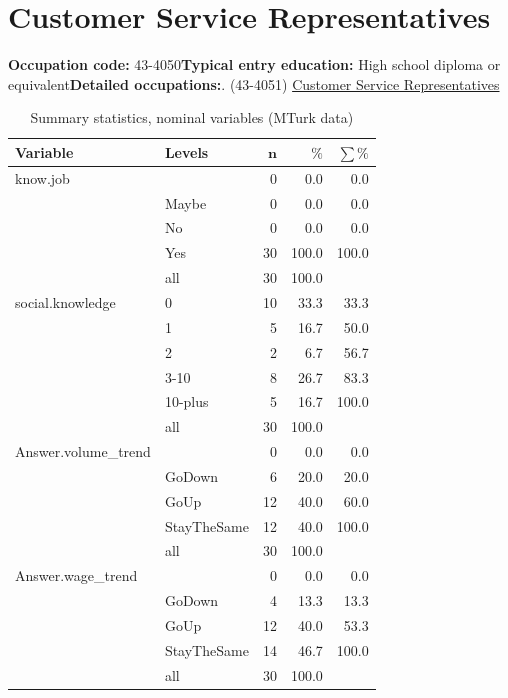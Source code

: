 \documentclass[a4paper,10pt]{article}\usepackage[]{graphicx}\usepackage[]{color}
\begin{document}
\newpage\section{Customer Service Representatives}\textbf{Occupation code:} 43-4050\newline\textbf{Typical entry education:} High school diploma or equivalent\newline\textbf{Detailed occupations:}. (43-4051)  \href{http://www.bls.gov/oes/current/oes434051.htm}{Customer Service Representatives}\newline%
\begin{table}[ht]
\centering
{\footnotesize
\begin{tabular}{ll|rrr}
 \textbf{Variable} & \textbf{Levels} & $\mathbf{n}$ & $\mathbf{\%}$ & $\mathbf{\sum \%}$ \\ 
  \hline
know.job &  & 0 & 0.0 & 0.0 \\ 
   & Maybe & 0 & 0.0 & 0.0 \\ 
   & No & 0 & 0.0 & 0.0 \\ 
   & Yes & 30 & 100.0 & 100.0 \\ 
   \hline
 & all & 30 & 100.0 &  \\ 
   \hline
\hline
social.knowledge & 0 & 10 & 33.3 & 33.3 \\ 
   & 1 & 5 & 16.7 & 50.0 \\ 
   & 2 & 2 & 6.7 & 56.7 \\ 
   & 3-10 & 8 & 26.7 & 83.3 \\ 
   & 10-plus & 5 & 16.7 & 100.0 \\ 
   \hline
 & all & 30 & 100.0 &  \\ 
   \hline
\hline
Answer.volume\_trend &  & 0 & 0.0 & 0.0 \\ 
   & GoDown & 6 & 20.0 & 20.0 \\ 
   & GoUp & 12 & 40.0 & 60.0 \\ 
   & StayTheSame & 12 & 40.0 & 100.0 \\ 
   \hline
 & all & 30 & 100.0 &  \\ 
   \hline
\hline
Answer.wage\_trend &  & 0 & 0.0 & 0.0 \\ 
   & GoDown & 4 & 13.3 & 13.3 \\ 
   & GoUp & 12 & 40.0 & 53.3 \\ 
   & StayTheSame & 14 & 46.7 & 100.0 \\ 
   \hline
 & all & 30 & 100.0 &  \\ 
   \hline
\hline
\end{tabular}
}
\caption{Summary statistics, nominal variables (MTurk data)} 
\label{tab1:43-4050}
\end{table}
\end{document}
